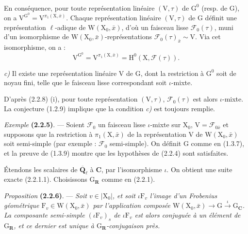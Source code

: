 \documentclass[11pt,leqno]{article}
\newcommand{\Page}[1]{\ifvmode\noindent\else\unskip\ \fi{\footnotesize\textcolor{gray}{[p.\,#1]}}\ \ignorespaces}
\begin{document}
\Page{194}

En conséquence, pour toute représentation linéaire \((\mathrm V,\tau)\) de \(\mathrm G^0\) (resp. de \(\mathrm G\)), on a \(\mathrm V^{\mathrm G^0}=\mathrm V^{\pi_1(\mathrm X,\bar{x})}\). Chaque représentation linéaire \((\mathrm V,\tau)\) de \(\mathrm G\) définit une représentation \(\ell\)-adique de \(\mathrm W(\mathrm X_0,\bar{x})\), d’où un faisceau lisse \(\mathscr F_0(\tau)\), muni d’un isomorphisme de \(\mathrm W(\mathrm X_0,\bar{x})\)-représentations \(\mathscr F_0(\tau)_{\bar{x}}\sim\mathrm V\). Via cet isomorphisme, on a :
\[
\mathrm V^{\mathrm G^0}
=\mathrm V^{\pi_1(\mathrm X,\bar{x})}
=\mathrm H^0(\mathrm X,\mathscr F(\tau)).
\]

\textit{c)} Il existe une représentation linéaire \(\mathrm V\) de \(\mathrm G\), dont la restriction à \(\mathrm G^0\) soit de noyau fini, telle que le faisceau lisse correspondant soit \(\iota\)-mixte.

D’après (2.2.8) (i), pour toute représentation \((\mathrm V,\tau)\), \(\mathscr F_0(\tau)\) est alors \(\iota\)-mixte. La conjecture (1.2.9) implique que la condition \textit{c)} est toujours remplie.

\textit{Exemple} \textbf{(2.2.5)}. — Soient \(\mathscr F_0\) un faisceau lisse \(\iota\)-mixte sur \(\mathrm X_0\), \(\mathrm V=\mathscr F_{0\bar{x}}\) et supposons que la restriction à \(\pi_1(\mathrm X,\bar{x})\) de la représentation \(\mathrm V\) de \(\mathrm W(\mathrm X_0,\bar{x})\) soit semi-simple (par exemple : \(\mathscr F_0\) semi-simple). On définit \(\mathrm G\) comme en (1.3.7), et la preuve de (1.3.9) montre que les hypothèses de (2.2.4) sont satisfaites.

Étendons les scalaires de \(\overline{\mathbf Q}_\ell\) à \(\mathbf C\), par l’isomorphisme \(\iota\). On obtient une suite exacte (2.2.1.1). Choisissons \(\mathrm G_{\mathbf R}\) comme en (2.2.1).

\textit{Proposition} \textbf{(2.2.6)}. — \textit{Soit \(v\in|\mathrm X_0|\), et soit \(\iota\mathrm F_v\) l’image d’un Frobenius géométrique \(\mathrm F_v\in\mathrm W(\mathrm X_0,\bar{x})\) par l’application composée \(\mathrm W(\mathrm X_0,\bar{x})\to\mathrm G\xrightarrow{\iota}\mathrm G_{\mathbf C}\). La composante semi-simple \((\iota\mathrm F_v)_s\) de \(\iota\mathrm F_v\) est alors conjuguée à un élément de \(\mathrm G_{\mathbf R}\), et ce dernier est unique à \(\mathrm G_{\mathbf R}\)-conjugaison près.}
\end{document}

